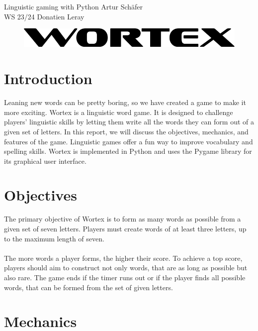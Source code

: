 \documentclass{article}[12pt]
\newcommand{\studentOne}{Artur Schäfer} %
\newcommand{\studentTwo}{Donatien Leray} %
\begin{document}
\noindent
Linguistic gaming with Python \hfill \studentOne\\
WS 23/24 \hfill \studentTwo

\vspace{1cm}

\begin{figure}[ht]
    \centering
    \includegraphics[width=\textwidth]{pictures/logo_black.png}
\end{figure}

\vspace{0.5cm}

    \section*{Introduction}

    Leaning new words can be pretty boring, so we have created a game to make
    it more exciting. Wortex is a linguistic word game. It is designed to
    challenge players' linguistic skills by letting them write all the words
    they can form out of a given set of letters. In this report, we will
    discuss the objectives, mechanics, and features of the game. Linguistic
    games offer a fun way to improve vocabulary and spelling skills. Wortex is
    implemented in Python and uses the Pygame library for its graphical user
    interface.

    \section*{Objectives}

    The primary objective of Wortex is to form as many words as possible from a
    given set of seven letters. Players must create words of at least three
    letters, up  to the maximum length of seven. \\\\ The more words a player
    forms, the higher their score. To achieve a top score, players should aim
    to construct not only words, that are as long as possible but also rare.
    The game ends if the timer runs out or if the player finds all possible
    words, that can be formed from the set of given letters.

    \section*{Mechanics}
\end{document}
